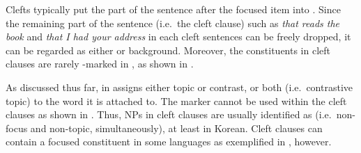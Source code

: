 



Clefts typically put the part of the sentence after the focused item
into . Since the remaining part of the
sentence (i.e.\ the cleft clause) such as \textit{that reads the
  book} and \textit{that I had your address} in each cleft sentences
can be freely dropped, it can be regarded as either  or
background.  Moreover, the constituents in cleft clauses are rarely
\onun-marked in , as shown in .






\noindent As discussed thus far, \nun in  assigns either
topic or contrast, or both (i.e.\ contrastive topic) to the word it is
attached to. The marker \nun cannot be used within the
cleft clauses as shown in . Thus, NPs in cleft
clauses are usually identified as  (i.e.\ non-focus
and non-topic, simultaneously), at least in Korean.  Cleft clauses can
contain a focused constituent in some languages as exemplified in
, however. 


